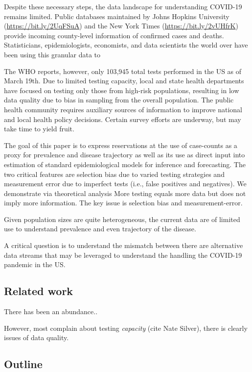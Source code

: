 \documentclass[12pt]{article}
\numberwithin{equation}{section}
\theoremstyle{plain}
\begin{document}
Despite these necessary steps, the data landscape for understanding COVID-19 remains limited.  Public databases maintained by Johns Hopkins University (\url{https://bit.ly/2UqFSuA}) and the New York Times (\url{https://bit.ly/2vUHfrK}) provide incoming county-level information of confirmed cases and deaths.
Statisticians, epidemiologists, economists, and data scientists the world over have been using this granular data to

The WHO reports, however, only 103,945 total tests performed in the US as of March 19th.  Due to limited testing capacity, local and state health departments have focused on testing only those from high-risk populations, resulting in low data quality due to bias in sampling from the overall population.  The public health community requires auxiliary sources of information to improve national and local health policy decisions.  Certain survey efforts are underway, but may take time to yield fruit.

The goal of this paper is to express reservations at the use of case-counts as a proxy for prevalence and disease trajectory as well as its use as direct input into estimation of standard epidemiological models for inference and forecasting.  The two critical features are selection bias due to varied testing strategies and measurement error due to imperfect tests (i.e., false positives and negatives).  We demonstrate via theoretical analysis
More testing equals more data but does not imply more information.  The key issue is selection bias and measurement-error.

Given population sizes are quite heterogeneous,
the current data are of limited use to understand prevalence and even trajectory of the disease.



A critical question is to understand the mismatch between  there are alternative data streams that may be leveraged to understand the handling the COVID-19 pandemic in the US.

\subsection{Related work}

There has been an abundance..

However, most complain about testing \emph{capacity} (cite Nate Silver), there is clearly issues of data quality.



\subsection{Outline}
\end{document}
